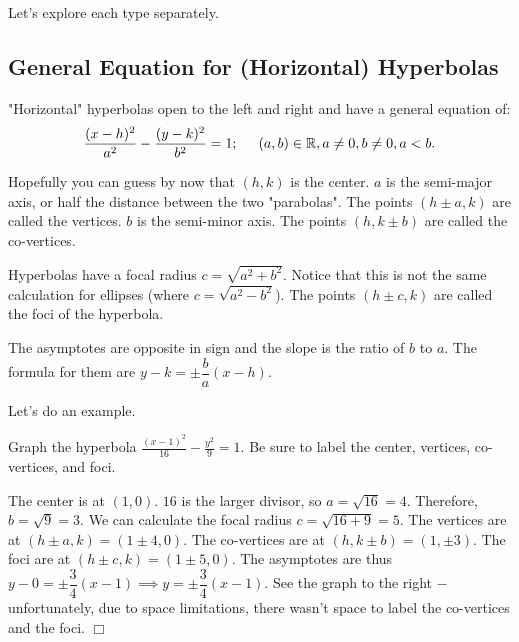 \documentclass[lang=en,11pt]{elegantbook}
\begin{document}
Let's explore each type separately.
\subsection{General Equation for (Horizontal) Hyperbolas}
\noindent "Horizontal" hyperbolas open to the left and right and have a general equation of:
$$ \frac{(x-h)^2}{a^2} - \frac{(y-k)^2}{b^2} = 1; \hspace{5mm} (a,b)\in\mathbb{R},a\neq 0,b\neq 0,a<b.$$

Hopefully you can guess by now that $(h,k)$ is the center.  $a$ is the semi-major axis, or half the distance between the two "parabolas".  The points $(h \pm a,k)$ are called the vertices.  $b$ is the semi-minor axis.  The points $(h,k \pm b)$ are called the co-vertices.

Hyperbolas have a focal radius $c=\sqrt{a^2+b^2}$.  Notice that this is not the same calculation for ellipses (where $c=\sqrt{a^2-b^2}$).  The points $(h \pm c,k)$ are called the foci of the hyperbola.

\begin{wrapfigure}{r}{5cm}
\end{wrapfigure}

The asymptotes are opposite in sign and the slope is the ratio of $b$ to $a$.  The formula for them are $y-k=\pm\dfrac{b}{a}(x-h)$.

Let's do an example.
\begin{example}
Graph the hyperbola $\frac{(x-1)^2}{16} - \frac{y^2}{9} = 1$.  Be sure to label the center, vertices, co-vertices, and foci.
\end{example}
\begin{solution}
The center is at $(1,0)$.  $16$ is the larger divisor, so $a=\sqrt{16}=4$.  Therefore, $b=\sqrt{9}=3$.  We can calculate the focal radius $c=\sqrt{16+9}=5$.  The vertices are at $(h \pm a ,k) = (1 \pm 4,0)$.  The co-vertices are at $(h,k \pm b)=(1,\pm 3)$.  The foci are at $(h \pm c,k) = (1 \pm 5, 0)$.  The asymptotes are thus $y-0=\pm\dfrac{3}{4}(x-1) \implies y=\pm\dfrac{3}{4}(x-1)$.  See the graph to the right $-$ unfortunately, due to space limitations, there wasn't space to label the co-vertices and the foci. $\Box$
\end{solution}
\end{document}
